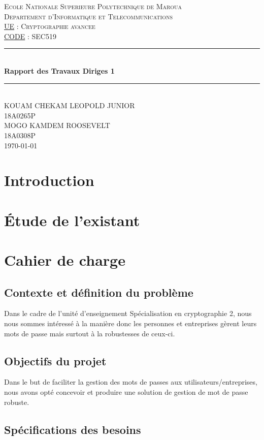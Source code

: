 \documentclass[11pt,a4paper]{report}
\begin{document}
\begin{titlepage}
\newcommand{\HRule}{\rule{\linewidth}{0.5mm}}
\center
\textsc{\LARGE
Ecole Nationale Superieure Polytechnique de Maroua
} \\[1cm]
\textsc{\Large
Departement d'Informatique et Telecommunications
} \\[1cm]
\textsc{\large
\underline{UE} : Cryptographie avancee \\ \underline{CODE} : SEC519
} \\[1cm]
\HRule \\[0.4cm]
{ \huge \bfseries Rapport des Travaux Diriges 1  \\[0.15cm]}
\HRule \\[1.5cm]
KOUAM CHEKAM LEOPOLD JUNIOR \\
18A0265P \\[1cm]
MOGO KAMDEM ROOSEVELT\\
18A0308P \\[1cm]
\today \\ [1cm]
\end{titlepage}
\newpage
\tableofcontents
\chapter*{Introduction}
\chapter{Étude de l'existant}
\chapter{Cahier de charge}
\section{Contexte et définition du problème}
 Dans le cadre de l'unité d'enseignement Spécialisation en cryptographie 2, nous nous sommes intéressé à la manière donc les personnes et entreprises gèrent leurs mots de passe mais surtout à la robustesses de ceux-ci.
 \section{Objectifs du projet}
 Dans le but de faciliter la gestion des mots de passes aux utilisateurs/entreprises, nous avons opté concevoir et produire une solution de gestion de mot de passe robuste.
 \section{Spécifications des besoins}
\end{document}
